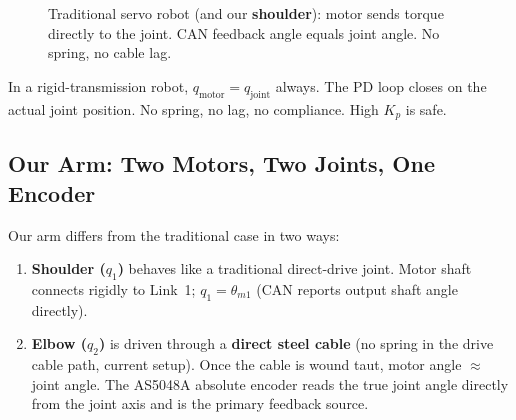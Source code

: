 \documentclass[11pt,a4paper]{article}
\begin{document}
\begin{figure}[H]
\centering
{}
\caption{Traditional servo robot (and our \textbf{shoulder}): motor sends torque directly
to the joint.  CAN feedback angle equals joint angle.  No spring, no cable lag.}
\label{fig:traditional}
\end{figure}

\begin{resultbox}
In a rigid-transmission robot, $q_{\mathrm{motor}}\!=\!q_{\mathrm{joint}}$ always.
The PD loop closes on the actual joint position.  No spring, no lag, no compliance.
High $K_p$ is safe.
\end{resultbox}

\subsection{Our Arm: Two Motors, Two Joints, One Encoder}
\label{sec:ourarm_overview}

Our arm differs from the traditional case in two ways:

\begin{enumerate}[leftmargin=2em]
  \item \textbf{Shoulder ($q_1$)} behaves like a traditional direct-drive joint.
        Motor shaft connects rigidly to Link~1; $q_1 = \theta_{m1}$ (CAN reports output shaft angle directly).
  \item \textbf{Elbow ($q_2$)} is driven through a \textbf{direct steel cable}
        (no spring in the drive cable path, current setup).  Once the cable
        is wound taut, motor angle $\approx$ joint angle.  The AS5048A
        absolute encoder reads the true joint angle directly from the joint
        axis and is the primary feedback source.
\end{enumerate}
\end{document}
